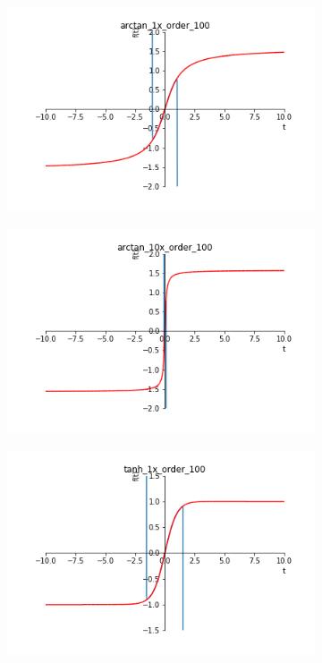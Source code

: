 \documentclass[arbeit=studie,oneside,BCOR=12mm]{ArbeitRST}
\begin{document}
\begin{figure}[ht]
\begin{subfigure}[c]{0.5\textwidth}
\centering
\includegraphics[width=1\textwidth]{images/arctan_1x_order_100}

\end{subfigure}
\begin{subfigure}[c]{0.5\textwidth}
\centering
\includegraphics[width=1\textwidth]{images/arctan_10x_order_100}

\end{subfigure}
\begin{subfigure}[c]{0.5\textwidth}
\centering
\includegraphics[width=1\textwidth]{images/tanh_1x_order_100}


\end{subfigure}
\end{figure}
\end{document}
